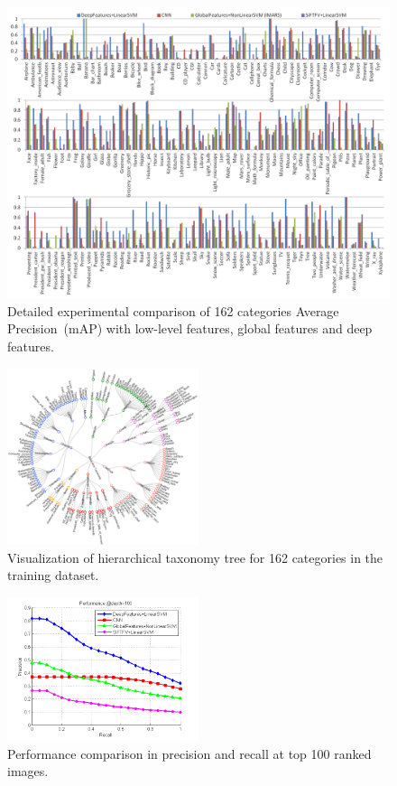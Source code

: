 \documentclass[11pt,twocolumn,twoside]{IEEEtran}
\begin{document}
\begin{figure}[h]
\includegraphics[width=\textwidth]{fig9.png}
\centering
\caption{Detailed experimental comparison of 162 categories Average Precision~(mAP) with low-level features, global features and deep features.} \label{fig:fig6}
\end{figure}

\begin{figure}[h]
\centering
\includegraphics[width=0.5\textwidth]{fig10.png}
\caption{Visualization of hierarchical taxonomy tree for 162 categories in the training dataset.} \label{fig:fig6}
\end{figure}

\begin{figure}[h]
\includegraphics[width=0.5\textwidth]{fig11.png}
\centering
\caption{Performance comparison in precision and recall at top 100 ranked images.} \label{fig:fig6}
\end{figure}
\end{document}
